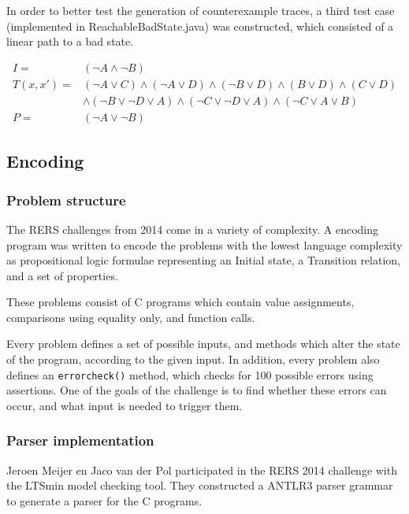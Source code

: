 \documentclass[a4paper]{article}
\begin{document}
In order to better test the generation of counterexample traces, a third test case (implemented in ReachableBadState.java) was constructed, which consisted of a linear path to a bad state.

\begin{align*}
I =& (\lnot A \land \lnot B)\\
T(x,x') =& (\lnot A \lor C) \land (\lnot A \lor D) \land (\lnot B \lor D) \land (B \lor D) \land (C \lor D)\\
&\land (\lnot B \lor \lnot D \lor A) \land (\lnot C \lor \lnot D \lor A) \land (\lnot C \lor A \lor B)\\
P =& (\lnot A \lor \lnot B)
\end{align*}

\subsection{Encoding} %
\subsubsection{Problem structure}
The RERS challenges from 2014 come in a variety of complexity. A encoding program was written to encode the problems with the lowest language complexity as propositional logic formulae representing an Initial state, a Transition relation, and a set of properties.

These problems consist of C programs which contain value assignments, comparisons using equality only, and function calls.

Every problem defines a set of possible inputs, and methods which alter the state of the program, according to the given input.
In addition, every problem also defines an \texttt{errorcheck()} method, which checks for 100 possible errors using assertions. One of the goals of the challenge is to find whether these errors can occur, and what input is needed to trigger them.


\subsubsection{Parser implementation}
Jeroen Meijer en Jaco van der Pol participated in the RERS 2014 challenge with the LTSmin model checking tool.
They constructed a ANTLR3 parser grammar to generate a parser for the C programs.
\end{document}
